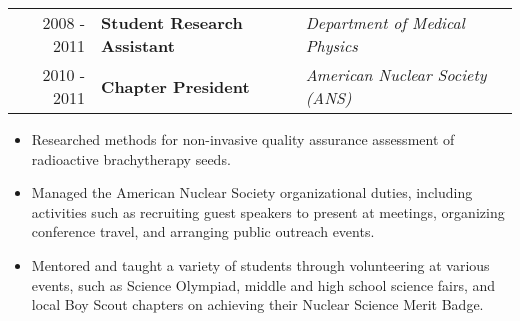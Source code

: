 
\begin{minipage}{\textwidth}
		\begin{tabular}{r|ll}
			2008 - 2011 & \textbf{Student Research Assistant} & \textit{Department of Medical Physics} \\
			2010 - 2011 & \textbf{Chapter President} & \textit{American Nuclear Society (ANS)} \\
		\end{tabular}
\end{minipage}

\begin{minipage}{\textwidth}
	\begin{itemize}
		\item Researched methods for non-invasive quality assurance assessment of radioactive brachytherapy seeds.
		\item Managed the American Nuclear Society organizational duties, including activities such as recruiting guest speakers to present at meetings, organizing conference travel, and arranging public outreach events.
		\item Mentored and taught a variety of students through volunteering at various events, such as Science Olympiad, middle and high school science fairs, and local Boy Scout chapters on achieving their Nuclear Science Merit Badge.
	\end{itemize}
\end{minipage}

